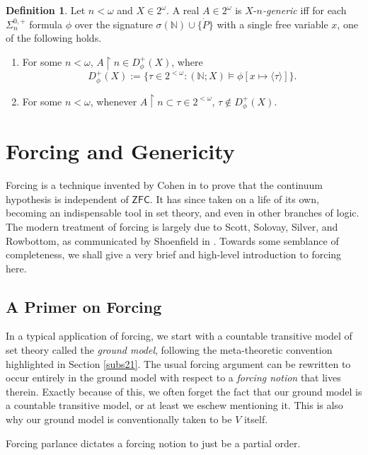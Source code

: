 \documentclass[12pt, twoside]{memoir}
\numberwithin{equation}{section}
\theoremstyle{definition}
\newtheorem{defi}[thm]{Definition}
\theoremstyle{remark}
\theoremstyle{definition}
\theoremstyle{definition}
\theoremstyle{definition}
\theoremstyle{remark}
\begin{document}
\begin{defi}
Let $n < \omega$ and $X \in 2^{\omega}$. A real $A \in 2^{\omega}$ is $X$-$n$\emph{-generic} iff for each $\Sigma^{0, +}_n$ formula $\phi$ over the signature $\sigma(\mathbb{N}) \cup \{\dot{P}\}$ with a single free variable $x$, one of the following holds.
\begin{enumerate}[label=(\alph*)]
    \item For some $n < \omega$, $A \restriction n \in D^+_{\phi}(X)$, where $$D^+_{\phi}(X) := \{\tau \in 2^{< \omega} : (\mathbb{N}; X) \models \phi[x \mapsto \langle \tau \rangle]\} \text{.}$$
    \item For some $n < \omega$, whenever $A \restriction n \subset \tau \in 2^{< \omega}$, $\tau \not\in D^+_{\phi}(X)$.
\end{enumerate}
\end{defi}

\chapter{Forcing and Genericity}\label{subs24}

Forcing is a technique invented by Cohen in \cite{cohen1} to prove that the continuum hypothesis is independent of $\mathsf{ZFC}$. It has since taken on a life of its own, becoming an indispensable tool in set theory, and even in other branches of logic. The modern treatment of forcing is largely due to Scott, Solovay, Silver, and Rowbottom, as communicated by Shoenfield in \cite{shoenfield}. Towards some semblance of completeness, we shall give a very brief and high-level introduction to forcing here.

\section{A Primer on Forcing}

In a typical application of forcing, we start with a countable transitive model of set theory called the \emph{ground model}, following the meta-theoretic convention highlighted in Section \ref{subs21}. The usual forcing argument can be rewritten to occur entirely in the ground model with respect to a \emph{forcing notion} that lives therein. Exactly because of this, we often forget the fact that our ground model is a countable transitive model, or at least we eschew mentioning it. This is also why our ground model is conventionally taken to be $V$ itself. 

Forcing parlance dictates a forcing notion to just be a partial order. 
\end{document}
